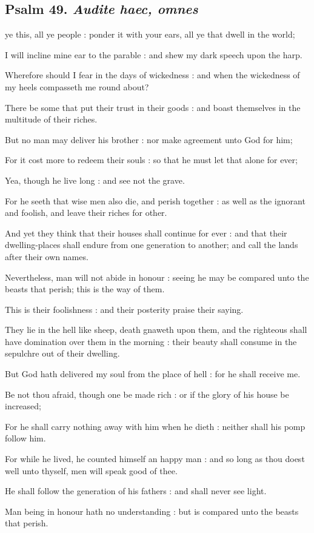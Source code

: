 \subsection{Psalm 49. \textit{Audite haec, omnes}}

 ye this, all ye people : ponder it with your ears, all ye that dwell in the world;\par
{}
I will incline mine ear to the parable : and shew my dark speech upon the harp.\par
{}Wherefore should I fear in the days of wickedness : and when the wickedness of my heels compasseth me round about?\par
{}There be some that put their trust in their goods : and boast themselves in the multitude of their riches.\par
{}But no man may deliver his brother : nor make agreement unto God for him;\par
{}For it cost more to redeem their souls : so that he must let that alone for ever;\par
{}Yea, though he live long : and see not the grave.\par
{}For he seeth that wise men also die, and perish together : as well as the ignorant and foolish, and leave their riches for other.\par
{}And yet they think that their houses shall continue for ever : and that their dwelling-places shall endure from one generation to another; and call the lands after their own names.\par
{}Nevertheless, man will not abide in honour : seeing he may be compared unto the beasts that perish; this is the way of them.\par
{}This is their foolishness : and their posterity praise their saying.\par
{}They lie in the hell like sheep, death gnaweth upon them, and the righteous shall have domination over them in the morning : their beauty shall consume in the sepulchre out of their dwelling.\par
{}But God hath delivered my soul from the place of hell : for he shall receive me.\par
{}Be not thou afraid, though one be made rich : or if the glory of his house be increased;\par
{}For he shall carry nothing away with him when he dieth : neither shall his pomp follow him.\par
{}For while he lived, he counted himself an happy man : and so long as thou doest well unto thyself, men will speak good of thee.\par
{}He shall follow the generation of his fathers : and shall never see light.\par
{}Man being in honour hath no understanding : but is compared unto the beasts that perish.\par

